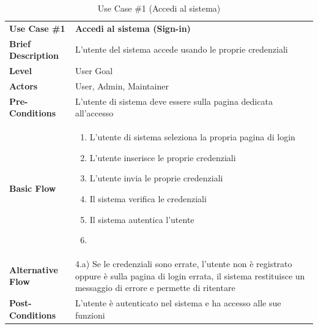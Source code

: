 \documentclass[a4paper, 11pt]{article}
\begin{document}
	\begin{table}[h]
		\centering
		\setlength{\arrayrulewidth}{0.8pt} %

		\begin{tabular}{|l p{12cm}|}
			\hline %

			\rowcolor{gray!25}
			\textbf{Use Case \#1} & \textbf{Accedi al sistema (Sign-in)} \\
			\textbf{Brief Description} & L'utente del sistema accede usando le proprie credenziali\\
			\textbf{Level} & User Goal \\
			\textbf{Actors} & User, Admin, Maintainer \\
			\textbf{Pre-Conditions} & L'utente di sistema deve essere sulla pagina dedicata all'accesso \\ %
			\textbf{Basic Flow} & \begin{enumerate}[label=\arabic*), leftmargin=*, before=\vspace{-0.7cm}, after=\vspace{-0.4cm}]
									  \item L'utente di sistema seleziona la propria pagina di login
									  \item L'utente inserisce le proprie credenziali
									  \item L'utente invia le proprie credenziali
									  \item Il sistema verifica le credenziali
									  \item Il sistema autentica l'utente
									  \item[]
			\end{enumerate} \\
			\textbf{Alternative Flow} & 4.a) Se le credenziali sono errate, l'utente non è registrato oppure è sulla pagina di login errata, il sistema restituisce un messaggio di errore e permette di ritentare \\ %
			\textbf{Post-Conditions} & L'utente è autenticato nel sistema e ha accesso alle sue funzioni \\

			\hline %
		\end{tabular}

		\vspace{0.2cm}
		\caption{Use Case \#1 (Accedi al sistema)}
	\end{table}
\end{document}
